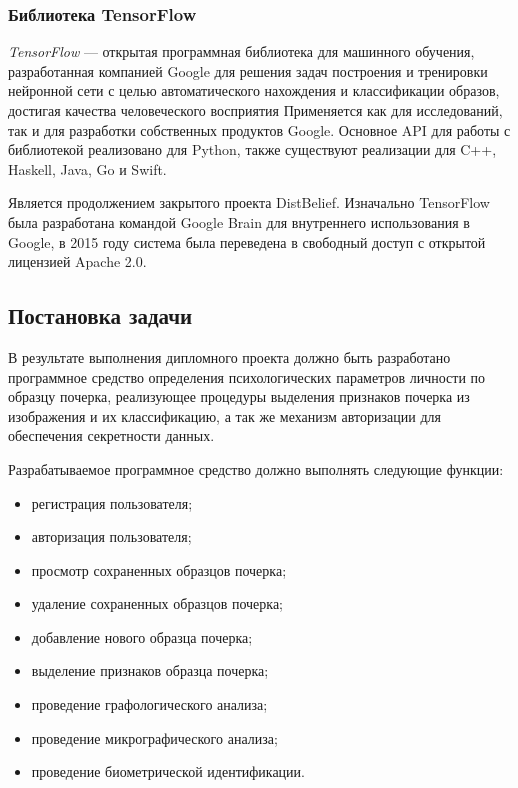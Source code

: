 \subsubsection{Библиотека TensorFlow}
\label{sec:techs:tensor_flow}
\emph{TensorFlow} — открытая программная библиотека для машинного обучения, разработанная компанией Google для решения задач построения и тренировки нейронной сети с целью автоматического нахождения и классификации образов, достигая качества человеческого восприятия Применяется как для исследований, так и для разработки собственных продуктов Google. Основное API для работы с библиотекой реализовано для Python, также существуют реализации для C++, Haskell, Java, Go и Swift.

Является продолжением закрытого проекта DistBelief. Изначально TensorFlow была разработана командой Google Brain для внутреннего использования в Google, в 2015 году система была переведена в свободный доступ с открытой лицензией Apache 2.0. 

\subsection{Постановка задачи}
\label{sec:domain:requirements}

В результате выполнения дипломного проекта должно быть разработано программное средство определения психологических параметров личности по образцу почерка, реализующее процедуры выделения признаков почерка из изображения и их классификацию, а так же механизм авторизации для обеспечения секретности данных.

Разрабатываемое программное средство должно выполнять следующие функции:
\begin{itemize}
  \item регистрация пользователя;
  \item авторизация пользователя;
  \item просмотр сохраненных образцов почерка;
  \item удаление сохраненных образцов почерка;
  \item добавление нового образца почерка;
  \item выделение признаков образца почерка;
  \item проведение графологического анализа;
  \item проведение микрографического анализа;
  \item проведение биометрической идентификации.
\end{itemize}

